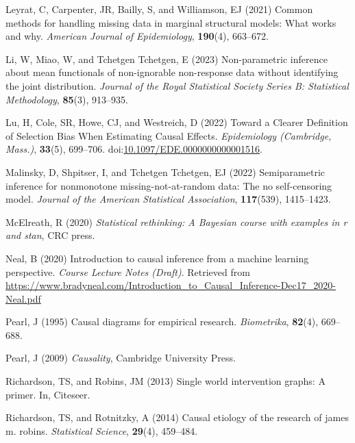 \documentclass[
  single column]{article}
\newlength{\cslhangindent}
\newenvironment{CSLReferences}[2] %
 {\begin{list}{}{%
  \setlength{\itemindent}{0pt}
  \setlength{\leftmargin}{0pt}
  \setlength{\parsep}{0pt}
  \ifodd #1
   \setlength{\leftmargin}{\cslhangindent}
   \setlength{\itemindent}{-1\cslhangindent}
  \fi
  \setlength{\itemsep}{#2\baselineskip}}}
 {\end{list}}
\begin{document}
\begin{CSLReferences}{1}{0}
Leyrat, C, Carpenter, JR, Bailly, S, and Williamson, EJ (2021) Common
methods for handling missing data in marginal structural models: What
works and why. \emph{American Journal of Epidemiology}, \textbf{190}(4),
663--672.

Li, W, Miao, W, and Tchetgen Tchetgen, E (2023) Non-parametric inference
about mean functionals of non-ignorable non-response data without
identifying the joint distribution. \emph{Journal of the Royal
Statistical Society Series B: Statistical Methodology}, \textbf{85}(3),
913--935.

Lu, H, Cole, SR, Howe, CJ, and Westreich, D (2022) Toward a Clearer
Definition of Selection Bias When Estimating Causal Effects.
\emph{Epidemiology (Cambridge, Mass.)}, \textbf{33}(5), 699--706.
doi:\href{https://doi.org/10.1097/EDE.0000000000001516}{10.1097/EDE.0000000000001516}.

Malinsky, D, Shpitser, I, and Tchetgen Tchetgen, EJ (2022)
Semiparametric inference for nonmonotone missing-not-at-random data: The
no self-censoring model. \emph{Journal of the American Statistical
Association}, \textbf{117}(539), 1415--1423.

McElreath, R (2020) \emph{Statistical rethinking: A {B}ayesian course
with examples in r and stan}, CRC press.

Neal, B (2020) Introduction to causal inference from a machine learning
perspective. \emph{Course Lecture Notes (Draft)}. Retrieved from
\url{https://www.bradyneal.com/Introduction_to_Causal_Inference-Dec17_2020-Neal.pdf}

Pearl, J (1995) Causal diagrams for empirical research.
\emph{Biometrika}, \textbf{82}(4), 669--688.

Pearl, J (2009) \emph{Causality}, Cambridge University Press.

Richardson, TS, and Robins, JM (2013) Single world intervention graphs:
A primer. In, Citeseer.

Richardson, TS, and Rotnitzky, A (2014) Causal etiology of the research
of james m. robins. \emph{Statistical Science}, \textbf{29}(4),
459--484.


\end{CSLReferences}
\end{document}
